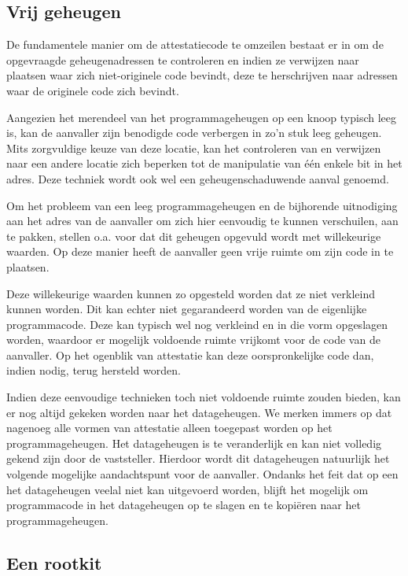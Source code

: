 \subsection{Vrij geheugen}

De fundamentele manier om de attestatiecode te omzeilen bestaat er in om de
opgevraagde geheugenadressen te controleren en indien ze verwijzen naar
plaatsen waar zich niet-originele code bevindt, deze te herschrijven naar
adressen waar de originele code zich bevindt.

Aangezien het merendeel van het programmageheugen op een knoop typisch leeg is,
kan de aanvaller zijn benodigde code verbergen in zo'n stuk leeg geheugen. Mits
zorgvuldige keuze van deze locatie, kan het controleren van en verwijzen naar
een andere locatie zich beperken tot de manipulatie van \'e\'en enkele bit in
het adres. Deze techniek wordt ook wel een geheugenschaduwende aanval genoemd.

Om het probleem van een leeg programmageheugen en de bijhorende uitnodiging aan
het adres van de aanvaller om zich hier eenvoudig te kunnen verschuilen, aan te
pakken, stellen o.a. \citep{yang2007distributed,seshadri2008sake} voor dat dit
geheugen opgevuld wordt met willekeurige waarden. Op deze manier heeft de
aanvaller geen vrije ruimte om zijn code in te plaatsen.

Deze willekeurige waarden kunnen zo opgesteld worden dat ze niet verkleind
kunnen worden. Dit kan echter niet gegarandeerd worden van de eigenlijke
programmacode. Deze kan typisch wel nog verkleind en in die vorm opgeslagen
worden, waardoor er mogelijk voldoende ruimte vrijkomt voor de code van de
aanvaller. Op het ogenblik van attestatie kan deze oorspronkelijke code dan,
indien nodig, terug hersteld worden.

Indien deze eenvoudige technieken toch niet voldoende ruimte zouden bieden, kan
er nog altijd gekeken worden naar het datageheugen. We merken immers op dat
nagenoeg alle vormen van attestatie alleen toegepast worden op het
programmageheugen. Het datageheugen is te veranderlijk en kan niet volledig
gekend zijn door de vaststeller. Hierdoor wordt dit datageheugen natuurlijk het
volgende mogelijke aandachtspunt voor de aanvaller. Ondanks het feit dat op een
\mcu het datageheugen veelal niet kan uitgevoerd worden, blijft het mogelijk om
programmacode in het datageheugen op te slagen en te kopi\"eren naar het
programmageheugen.

\subsection{Een rootkit}

